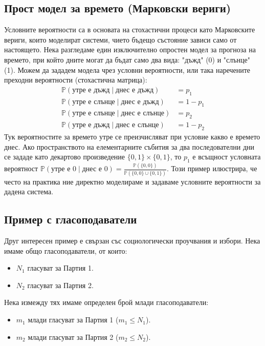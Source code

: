 \documentclass{article}
\begin{document}
\subsection{Прост модел за времето (Марковски вериги)}

Условните вероятности са в основата на стохастични процеси като Марковските вериги, които моделират системи, чието бъдещо състояние зависи само от настоящето.
Нека разгледаме един изключително опростен модел за прогноза на времето, при който дните могат да бъдат само два вида: "дъжд" (0) и "слънце" (1).
Можем да зададем модела чрез условни вероятности, или така наречените преходни вероятности (стохастична матрица):
\begin{align*}
\mathbb{P}(\text{утре е дъжд} \mid \text{днес е дъжд}) &= p_1 \\
\mathbb{P}(\text{утре е слънце} \mid \text{днес е дъжд}) &= 1 - p_1 \\
\mathbb{P}(\text{утре е слънце} \mid \text{днес е слънце}) &= p_2 \\
\mathbb{P}(\text{утре е дъжд} \mid \text{днес е слънце}) &= 1 - p_2
\end{align*}
Тук вероятностите за времето утре се преизчисляват при условие какво е времето днес. Ако пространството на елементарните събития за два последователни дни се зададе като декартово произведение $\{0, 1\} \times \{0, 1\}$, то $p_1$ е всъщност условната вероятност $\mathbb{P}(\text{утре е 0} \mid \text{днес е 0}) = \frac{\mathbb{P}(\{0, 0\})}{\mathbb{P}(\{0, 0\} \cup \{0, 1\})}$. Този пример илюстрира, че често на практика ние директно моделираме и задаваме условните вероятности за дадена система.

\subsection{Пример с гласоподаватели}

Друг интересен пример е свързан със социологически проучвания и избори.
Нека имаме общо гласоподаватели, от които:
\begin{itemize}
    \item $N_1$ гласуват за Партия 1.
    \item $N_2$ гласуват за Партия 2.
\end{itemize}
Нека измежду тях имаме определен брой млади гласоподаватели:
\begin{itemize}
    \item $m_1$ млади гласуват за Партия 1 ($m_1 \le N_1$).
    \item $m_2$ млади гласуват за Партия 2 ($m_2 \le N_2$).
\end{itemize}
\end{document}
